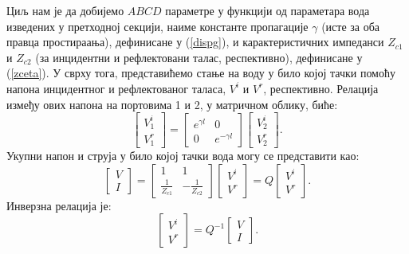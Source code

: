 Циљ нам је да добијемо $ABCD$ параметре у функцији од параметара вода изведених у претходној секцији, наиме константе пропагације $\gamma$ (исте за оба правца простираања), дефинисане у (\ref{dispg}), и карактеристичних импеданси $Z_{c1}$ и $Z_{c2}$ (за инцидентни и рефлектовани талас, респективно), дефинисане у (\ref{zceta}). У сврху тога, представићемо стање на воду у било којој тачки помоћу напона инцидентног и рефлектованог таласа, $V^i$ и $V^r$, респективно. Релација између ових напона на портовима 1 и 2, у матричном облику, биће:
\begin{equation}\label{modal_basis}
\begin{bmatrix} V^i_1 \\ V^r_1 \end{bmatrix} =
\begin{bmatrix} e^{\gamma l} & 0 \\ 0 & e^{-\gamma l} \end{bmatrix}
\begin{bmatrix} V^i_2 \\ V^r_2 \end{bmatrix}.
\end{equation}
Укупни напон и струја у било којој тачки вода могу се представити као:
\begin{equation}\label{slicnost}
\begin{bmatrix} V \\ I \end{bmatrix} =
\begin{bmatrix} 1 & 1 \\ \frac{1}{Z_{c1}} & -\frac{1}{Z_{c2}} \end{bmatrix}
\begin{bmatrix} V^i \\ V^r \end{bmatrix} = 
Q\begin{bmatrix} V^i \\ V^r \end{bmatrix}.
\end{equation}
Инверзна релација је:
\begin{equation}\label{slicnost2}
\begin{bmatrix} V^i \\ V^r \end{bmatrix} =
Q^{-1}\begin{bmatrix} V \\ I \end{bmatrix}.
\end{equation}
